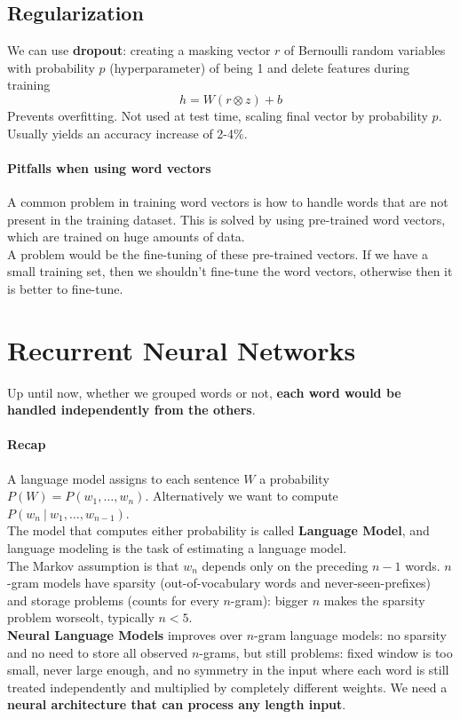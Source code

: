 \documentclass[10pt]{report}
\begin{document}
\subsection{Regularization} 
We can use \textbf{dropout}: creating a masking vector $r$ of Bernoulli random variables with probability $p$ (hyperparameter) of being 1 and delete features during training $$h = W(r\otimes z) + b$$
Prevents overfitting. Not used at test time, scaling final vector by probability $p$. Usually yields an accuracy increase of 2-4\%.
\paragraph{Pitfalls when using word vectors} A common problem in training word vectors is how to handle words that are not present in the training dataset. This is solved by using pre-trained word vectors, which are trained on huge amounts of data.\\
A problem would be the fine-tuning of these pre-trained vectors. If we have a small training set, then we shouldn't fine-tune the word vectors, otherwise then it is better to fine-tune.
\section{Recurrent Neural Networks}
Up until now, whether we grouped words or not, \textbf{each word would be handled independently from the others}.
\paragraph{Recap} A language model assigns to each sentence $W$ a probability $P(W) = P(w_1,\ldots,w_n)$. Alternatively we want to compute $P(w_n\:|\:w_1,\ldots,w_{n-1})$.\\
The model that computes either probability is called \textbf{Language Model}, and language modeling is the task of estimating a language model.\\
The Markov assumption is that $w_n$ depends only on the preceding $n-1$ words. $n$-gram models have sparsity (out-of-vocabulary words and never-seen-prefixes) and storage problems (counts for every $n$-gram): bigger $n$ makes the sparsity problem worseolt, typically $n<5$.\\
\textbf{Neural Language Models} improves over $n$-gram language models: no sparsity and no need to store all observed $n$-grams, but still problems: fixed window is too small, never large enough, and no symmetry in the input where each word is still treated independently and multiplied by completely different weights. We need a \textbf{neural architecture that can process any length input}.
\end{document}
